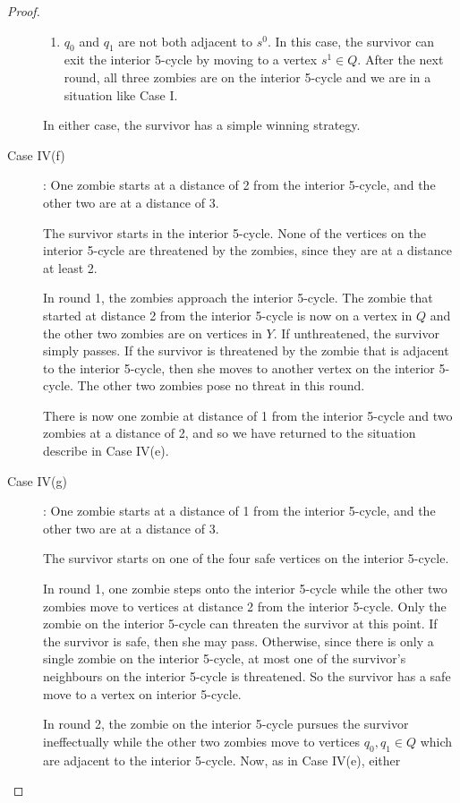 \begin{proof}
\begin{description}
\begin{enumerate}
\item $q_0$ and $q_1$ are not both adjacent to $s^0$. In this case, the survivor can exit the interior 5-cycle by moving to a vertex $s^1 \in Q$. After the next
round, all three zombies are on the interior 5-cycle and we are in a situation like Case I.
\end{enumerate}

In either case, the survivor has a simple winning strategy.


\item[Case IV(f)]: One zombie starts at a distance of 2 from the interior 5-cycle, and the other two are at a distance of 3.

The survivor starts in the interior 5-cycle. None of the vertices on the interior 5-cycle are threatened by the zombies, since they are at a distance at least 2.

In round 1, the zombies approach the interior 5-cycle. The zombie that started at distance 2 from the interior 5-cycle is now on a vertex in $Q$ and the other two
zombies are on vertices in $Y$. If unthreatened, the survivor simply passes.
If the survivor is threatened by the zombie that is adjacent to the interior 5-cycle, then she moves to another vertex on the interior 5-cycle. The other two zombies
pose no threat in this round.

There is now one zombie at distance of 1 from the interior 5-cycle and two zombies at a distance of 2, and so we have returned to the situation describe in Case IV(e).

\item[Case IV(g)]: One zombie starts at a distance of 1 from the interior 5-cycle, and the other two are at a distance of 3.

The survivor starts on one of the four safe vertices on the interior 5-cycle.

In round 1, one zombie steps onto the interior 5-cycle while the other two zombies move to vertices at distance 2 from the interior 5-cycle.
Only the zombie on the interior 5-cycle can threaten the survivor at this point. If the survivor is safe, then she may pass. Otherwise, since there is
only a single zombie on the interior 5-cycle, at most one of the survivor's neighbours on the interior 5-cycle is threatened.
So the survivor has a safe move to a vertex on interior 5-cycle.

In round 2, the zombie on the interior 5-cycle pursues the survivor ineffectually while the other two zombies move to vertices $q_0, q_1 \in Q$ which are
adjacent to the interior 5-cycle. Now, as in Case IV(e), either


\end{description}
\end{proof}
